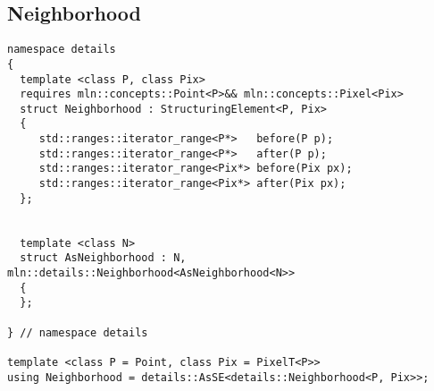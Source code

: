 \subsection{Neighborhood}

\begin{verbatim}
namespace details
{
  template <class P, class Pix>
  requires mln::concepts::Point<P>&& mln::concepts::Pixel<Pix>
  struct Neighborhood : StructuringElement<P, Pix>
  {
     std::ranges::iterator_range<P*>   before(P p);
     std::ranges::iterator_range<P*>   after(P p);
     std::ranges::iterator_range<Pix*> before(Pix px);
     std::ranges::iterator_range<Pix*> after(Pix px);
  };


  template <class N>
  struct AsNeighborhood : N, mln::details::Neighborhood<AsNeighborhood<N>>
  {
  };

} // namespace details

template <class P = Point, class Pix = PixelT<P>>
using Neighborhood = details::AsSE<details::Neighborhood<P, Pix>>;
\end{verbatim}
